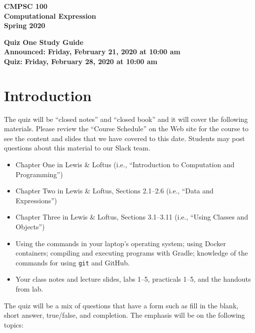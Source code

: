\documentclass[11pt]{article}
\newcommand{\assignmentduedate}{February 28}
\newcommand{\assignmentassignedate}{February 21}
\newcommand{\assignmentnumber}{One}
\newcommand{\labyear}{2020}
\newcommand{\assignedday}{Friday}
\newcommand{\dueday}{Friday}
\newcommand{\labtime}{10:00 am}
\newcommand{\assigneddate}{Announced: \assignedday, \assignmentassignedate, \labyear{} at \labtime{}}
\newcommand{\duedate}{Quiz: \dueday, \assignmentduedate, \labyear{} at \labtime{}}
\newcommand{\guidetitle}[1]
{
  \begin{center}
    \begin{center}
      \bf
      CMPSC 100\\Computational Expression\\
      Spring 2020\\
      \medskip
    \end{center}
    \bf
    #1
  \end{center}
}
\begin{document}
\thispagestyle{empty}

\guidetitle{Quiz \assignmentnumber{} Study Guide \\ \assigneddate{} \\ \duedate{}}

\section*{Introduction}

\noindent
The quiz will be ``closed notes'' and ``closed book'' and it will cover the
following materials. Please review the ``Course Schedule'' on the Web site for
the course to see the content and slides that we have covered to this date.
Students may post questions about this material to our Slack team.

\begin{itemize}

  \itemsep 0in

  \item Chapter One in Lewis \& Loftus (i.e., ``Introduction to Computation and
    Programming'')

  \item Chapter Two in Lewis \& Loftus, Sections 2.1--2.6 (i.e., ``Data and
    Expressions'')

  \item Chapter Three in Lewis \& Loftus, Sections 3.1--3.11 (i.e., ``Using
    Classes and Objects'')

  \item Using the commands in your laptop's operating system; using Docker
    containers; compiling and executing programs with Gradle; knowledge of the
    commands for using {\tt git} and GitHub.

  \item Your class notes and lecture slides, labs 1--5, practicals 1--5, and the
    handouts from lab.

\end{itemize}

\noindent The quiz will be a mix of questions that have a form such as fill in
the blank, short answer, true/false, and completion. The emphasis will be on the
following topics:
\end{document}
